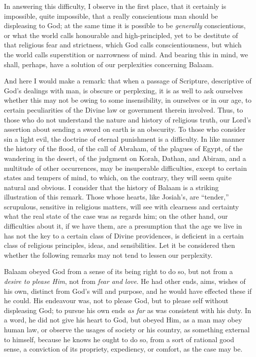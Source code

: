 In answering this difficulty, I observe in the first place, that it
certainly is impossible, quite impossible, that a really conscientious
man should be displeasing to God; at the same time it is possible to
be \emph{generally} conscientious, or what the world calls honourable
and high-principled, yet to be destitute of that religious fear and
strictness, which God calls conscientiousness, but which the world
calls superstition or narrowness of mind. And bearing this in mind, we
shall, perhaps, have a solution of our perplexities concerning Balaam.

And here I would make a remark: that when a passage of Scripture,
descriptive of God's dealings with man, is obscure or perplexing, it
is as well to ask ourselves whether this may not be owing to some
insensibility, in ourselves or in our age, to certain peculiarities of
the Divine law or government therein involved. Thus, to those who do
not understand the nature and history of religious truth, our Lord's
assertion about sending a sword on earth is an obscurity. To those who
consider sin a light evil, the doctrine of eternal punishment is a
difficulty. In like manner the history of the flood, of the call of
Abraham, of the plagues of Egypt, of the wandering in the desert, of
the judgment on Korah, Dathan, and Abiram, and a multitude of other
occurrences, may be insuperable difficulties, except to certain states
and tempers of mind, to which, on the contrary, they will seem quite
natural and obvious. I consider that the history of Balaam is a
striking illustration of this remark. Those whose hearts, like
Josiah's, are ``tender,'' scrupulous, sensitive in religious
matters, will see with clearness and certainty what the real state of
the case was as regards him; on the other hand, our difficulties about
it, if we have them, are a presumption that the age we live in has not
the key to a certain class of Divine providences, is deficient in a
certain class of religious principles, ideas, and sensibilities. Let
it be considered then whether the following remarks may not tend to
lessen our perplexity.

Balaam obeyed God from a sense of its being right to do so, but not
from a \emph{desire to please Him}, not from \emph{fear and love}. He
had other ends, aims, wishes of his own, distinct from God's will and
purpose, and he would have effected these if he could. His endeavour
was, not to please God, but to please self without displeasing God; to
pursue his own ends \emph{as far} as was consistent with his duty. In
a word, he did not give his heart to God, but obeyed Him, as a man may
obey human law, or observe the usages of society or his country, as
something external to himself, because he knows he ought to do so,
from a sort of rational good sense, a conviction of its propriety,
expediency, or comfort, as the case may be.

